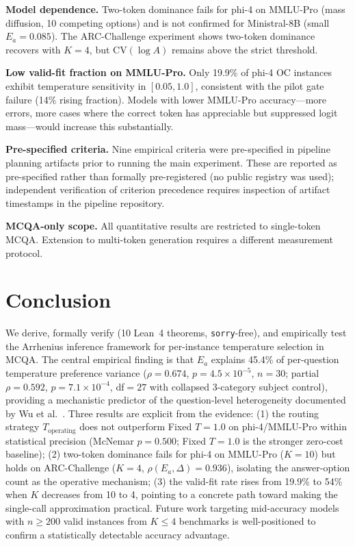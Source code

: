 \documentclass[11pt,letterpaper,twocolumn]{article}
\begin{document}
\textbf{Model dependence.} Two-token dominance fails for phi-4 on MMLU-Pro (mass
diffusion, 10 competing options) and is not confirmed for Ministral-8B (small $E_a =
0.085$). The ARC-Challenge experiment shows two-token dominance recovers with $K=4$, but
$\text{CV}(\log A)$ remains above the strict threshold.

\textbf{Low valid-fit fraction on MMLU-Pro.} Only 19.9\% of phi-4 OC instances exhibit
temperature sensitivity in $[0.05, 1.0]$, consistent with the pilot gate failure (14\%
rising fraction). Models with lower MMLU-Pro accuracy---more errors, more cases where the
correct token has appreciable but suppressed logit mass---would increase this substantially.

\textbf{Pre-specified criteria.} Nine empirical criteria were pre-specified in pipeline
planning artifacts prior to running the main experiment. These are reported as
pre-specified rather than formally pre-registered (no public registry was used);
independent verification of criterion precedence requires inspection of artifact timestamps
in the pipeline repository.

\textbf{MCQA-only scope.} All quantitative results are restricted to single-token MCQA.
Extension to multi-token generation requires a different measurement protocol.

\section{Conclusion}

We derive, formally verify (10 Lean~4 theorems, \texttt{sorry}-free), and empirically
test the Arrhenius inference framework for per-instance temperature selection in MCQA.
The central empirical finding is that $E_a$ explains 45.4\% of per-question temperature
preference variance ($\rho = 0.674$, $p = 4.5 \times 10^{-5}$, $n=30$; partial $\rho =
0.592$, $p = 7.1 \times 10^{-4}$, df$=27$ with collapsed 3-category subject control),
providing a mechanistic predictor of the question-level heterogeneity documented by Wu et
al.~\cite{Wu2025}. Three results are explicit from the evidence: (1) the routing strategy
$T_\text{operating}$ does not outperform Fixed $T=1.0$ on phi-4/MMLU-Pro within
statistical precision (McNemar $p=0.500$; Fixed $T=1.0$ is the stronger zero-cost
baseline); (2) two-token dominance fails for phi-4 on MMLU-Pro ($K=10$) but holds on
ARC-Challenge ($K=4$, $\rho(E_a, \Delta) = 0.936$), isolating the answer-option count
as the operative mechanism; (3) the valid-fit rate rises from 19.9\% to 54\% when $K$
decreases from 10 to 4, pointing to a concrete path toward making the single-call
approximation practical. Future work targeting mid-accuracy models with $n \geq 200$
valid instances from $K \leq 4$ benchmarks is well-positioned to confirm a statistically
detectable accuracy advantage.



\end{document}
